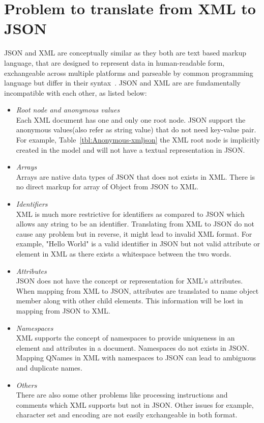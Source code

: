 \section{Problem to translate from XML to JSON}
JSON and XML are conceptually similar as they both are text based markup language, that are designed to represent data in human-readable form, exchangeable across multiple platforms and parseable by common programming language but differ in their syntax~\citep{lee2011jxon}. JSON and XML are are fundamentally incompatible with each other, as listed below:
\begin{itemize}
\item \textit{Root node and anonymous values}
\\
Each XML document has one and only one root node. JSON support the anonymous values(also refer as string value) that do not need key-value pair. For example, Table~\ref{tbl:Anonymous-xmljson} the XML root node is implicitly created in the model and will not have a textual representation in JSON.

	\item \textit{Arrays}\\
		Arrays are native data types of JSON that does not exists in XML. There is no direct markup for array of Object from JSON to XML.
		\item \textit{Identifiers}\\
		XML is much more restrictive for identifiers as compared to JSON which allows any string to be an identifier. Translating from XML to JSON do not cause any problem but in reverse, it might lead to invalid XML format. For example, "Hello World" is a valid identifier in JSON but not valid attribute or element in XML as there exists a whitespace between the two words.
		\item \textit{Attributes}\\
		JSON does not have the concept or representation for XML's attributes. When mapping from XML to JSON, attributes are translated to name object member along with other child elements. This information will be lost in mapping from JSON to XML.
		\item \textit{Namespaces}\\
		XML supports the concept of namespaces to provide uniqueness in an element and attributes in a document. Namespaces do not exists in JSON. Mapping QNames in XML with namespaces to JSON can lead to ambiguous and duplicate names.
		\item \textit{Others}\\
		There are also some other problems like processing instructions and  comments which XML supports but not in JSON. Other issues for example, character set and encoding are not easily exchangeable in both format.
\end{itemize}

